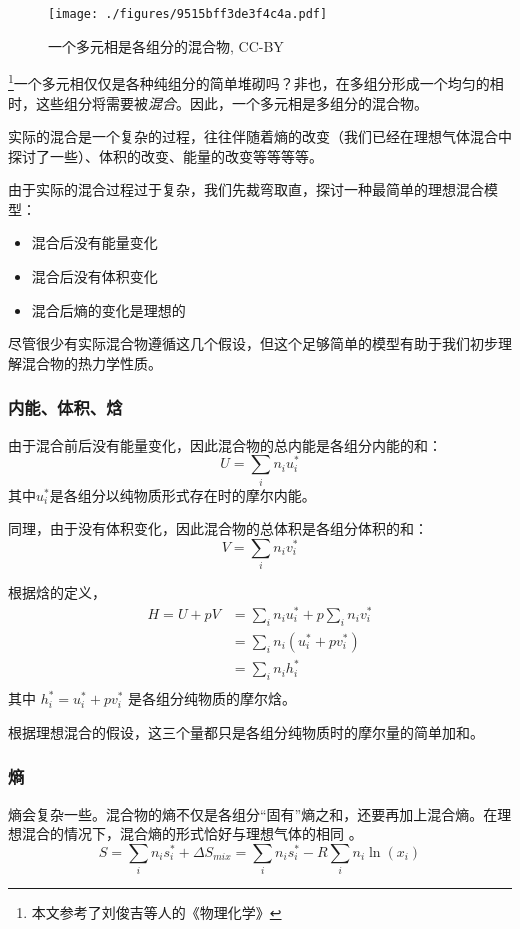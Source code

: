 

\begin{figure}[ht]
\centering
\texttt{[image: ./figures/9515bff3de3f4c4a.pdf]}
\caption{一个多元相是各组分的混合物, CC-BY} \label{fig_IMCPTV_1}
\end{figure}

\footnote{本文参考了刘俊吉等人的《物理化学》}一个多元相仅仅是各种纯组分的简单堆砌吗？非也，在多组分形成一个均匀的相时，这些组分将需要被\textsl{混合}。因此，一个多元相是多组分的混合物。

实际的混合是一个复杂的过程，往往伴随着熵的改变（我们已经在理想气体混合中探讨了一些）、体积的改变、能量的改变等等等等。

由于实际的混合过程过于复杂，我们先裁弯取直，探讨一种最简单的理想混合模型：
\begin{itemize}
\item 混合后没有能量变化
\item 混合后没有体积变化
\item 混合后熵的变化是理想的
\end{itemize}
尽管很少有实际混合物遵循这几个假设，但这个足够简单的模型有助于我们初步理解混合物的热力学性质。

\subsubsection{内能、体积、焓}
由于混合前后没有能量变化，因此混合物的总内能是各组分内能的和：
$$
U = \sum_i n_i u_i^*
$$
其中$u_i^*$是各组分以纯物质形式存在时的摩尔内能。

同理，由于没有体积变化，因此混合物的总体积是各组分体积的和：
$$
V = \sum_i n_i v_i^*
$$

根据焓的定义，
$$
\begin{aligned}
H=U+pV&=\sum_i n_i u_i^*+p\sum_i n_i v_i^*\\
&=\sum_i n_i (u_i^*+p v_i^*)\\
&=\sum_i n_i h_i^*\\
\end{aligned}
$$
其中 $h^*_i = u_i^* + p v_i^*$ 是各组分纯物质的摩尔焓。

根据理想混合的假设，这三个量都只是各组分纯物质时的摩尔量的简单加和。

\subsubsection{熵}
熵会复杂一些。混合物的熵不仅是各组分“固有”熵之和，还要再加上混合熵。在理想混合的情况下，混合熵的形式恰好与理想气体的相同 。%
$$S = \sum_i n_i s_i^* + \Delta S_{mix} = \sum_i n_i s_i^* - R \sum_i n_i \ln (x_i) $$

